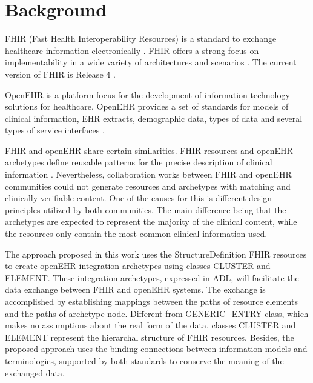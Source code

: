 \section{Background}

FHIR (Fast Health Interoperability Resources) is a standard to exchange healthcare information electronically  \cite{FHIRClinician}. FHIR offers a strong focus on  implementability in a wide variety of architectures and scenarios \cite{FHIRExecutive}. The current version of FHIR is Release 4 \cite{FHIR}.

OpenEHR is a platform focus for the development of information technology solutions for healthcare. OpenEHR provides a set of standards for models of clinical information, EHR extracts, demographic data, types of data and several types of service interfaces \cite{openEHRWhitePaper}.







FHIR and openEHR share certain similarities. FHIR resources and openEHR archetypes define reusable patterns for the precise description of clinical information \cite{Bosca15}. Nevertheless, collaboration works between FHIR and openEHR communities \cite{Collaboration} could not generate resources and archetypes with matching and clinically verifiable content. One of the causes for this is different design principles utilized by both communities. The main difference being that the archetypes are expected to represent the majority of the clinical content, while the resources only contain the most common clinical information used.

The approach proposed in this work uses the StructureDefinition FHIR resources to create openEHR integration archetypes using classes CLUSTER and ELEMENT. These integration archetypes, expressed in ADL, will facilitate the data exchange between FHIR and openEHR systems. The exchange is accomplished by establishing mappings between the paths of resource elements and the paths of archetype node. Different from GENERIC\_ENTRY class, which makes no assumptions about the real form of the data, classes CLUSTER and ELEMENT represent the hierarchal structure of FHIR resources. Besides, the proposed approach uses the binding connections between information models and terminologies, supported by both standards to conserve the meaning of the exchanged data.
